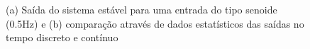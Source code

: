 \begin{figure}[H]
\begin{center}
\end{center}
\caption{(a) Saída do sistema estável para uma entrada do tipo senoide (0.5Hz) e (b) comparação através de dados estatísticos das saídas no tempo discreto e contínuo}
\label{saida:est:2} 
\end{figure}


